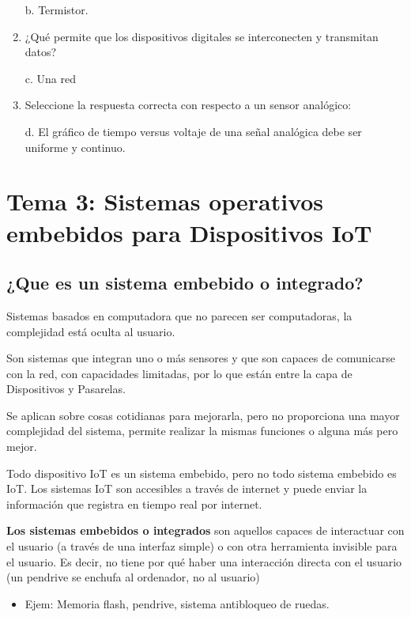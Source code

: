 \documentclass[12pt, twoside, openright]{report} %
\begin{document}
\begin{enumerate}
	      b. Termistor.

	\item ¿Qué permite que los dispositivos digitales se interconecten y transmitan datos?

	      c. Una red

	\item Seleccione la respuesta correcta con respecto a un sensor analógico:

	      d. El gráfico de tiempo versus voltaje de una señal analógica debe ser uniforme y continuo.

\end{enumerate}

\chapter{Tema 3: Sistemas operativos embebidos para Dispositivos
  IoT}

\section{¿Que es un sistema embebido o
  integrado?}

Sistemas basados en computadora que no parecen ser computadoras, la complejidad está oculta al usuario.

Son sistemas que integran uno o más sensores y que son capaces de
comunicarse con la red, con capacidades limitadas, por lo que están
entre la capa de Dispositivos y Pasarelas.

Se aplican sobre cosas cotidianas para mejorarla, pero no
proporciona una mayor complejidad del sistema, permite realizar la
mismas funciones o alguna más pero mejor.

Todo dispositivo IoT es un sistema embebido, pero no todo sistema
embebido es IoT. Los sistemas IoT son accesibles a través de internet y
puede enviar la información que registra en tiempo real por internet.

\textbf{Los sistemas embebidos o integrados} son aquellos capaces de
interactuar con el usuario (a través de una interfaz simple) o con otra herramienta invisible para el usuario. Es decir, no tiene por qué haber una interacción directa con el usuario (un pendrive se enchufa al ordenador, no al usuario)

\begin{itemize}
	\item Ejem: Memoria flash, pendrive, sistema antibloqueo de ruedas.
\end{itemize}
\end{document}
